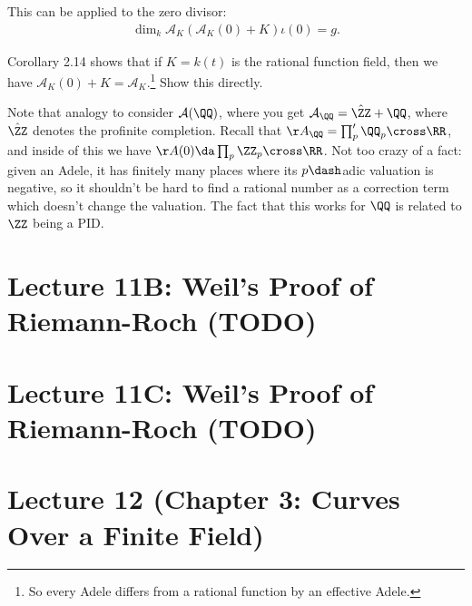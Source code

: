 \begin{corollary}[2.14]

This can be applied to the zero divisor:
\begin{align*}  
\dim_k \mathcal{A}_K( \mathcal{A}_K(0) + K ) \iota(0) = g
.\end{align*}

\end{corollary}

\begin{exercise}[?]

Corollary 2.14 shows that if \(K = k(t)\) is the rational function
field, then we have \(\mathcal{A}_K(0) + K = \mathcal{A}_K\).\footnote{So
  every Adele differs from a rational function by an effective Adele.}
Show this directly.

\end{exercise}

\begin{remark}

Note that analogy to consider \(\mathcal{A}(\QQ)\), where you get
\(\mathcal{A}_\QQ = \hat \ZZ + \QQ\), where \(\hat \ZZ\) denotes the
profinite completion. Recall that
\(\AA_\QQ = \prod_p' \QQ_p \cross \RR\), and inside of this we have
\(\AA(0) \da \prod_p \ZZ_p \cross \RR\). Not too crazy of a fact: given
an Adele, it has finitely many places where its \(p\dash\)adic valuation
is negative, so it shouldn't be hard to find a rational number as a
correction term which doesn't change the valuation. The fact that this
works for \(\QQ\) is related to \(\ZZ\) being a PID.

\end{remark}

\hypertarget{lecture-11b-weils-proof-of-riemann-roch-todo}{%
\section{Lecture 11B: Weil's Proof of Riemann-Roch
(TODO)}\label{lecture-11b-weils-proof-of-riemann-roch-todo}}

\hypertarget{lecture-11c-weils-proof-of-riemann-roch-todo}{%
\section{Lecture 11C: Weil's Proof of Riemann-Roch
(TODO)}\label{lecture-11c-weils-proof-of-riemann-roch-todo}}

\hypertarget{lecture-12-chapter-3-curves-over-a-finite-field}{%
\section{Lecture 12 (Chapter 3: Curves Over a Finite
Field)}\label{lecture-12-chapter-3-curves-over-a-finite-field}}

